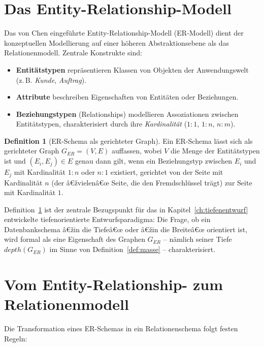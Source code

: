 ﻿\documentclass[a4paper,12pt]{report}
\theoremstyle{definition}
\newtheorem{definition}{Definition}[chapter]
\theoremstyle{remark}
\newcommand{\depth}{\mathit{depth}}
\begin{document}
\section{Das Entity-Relationship-Modell}
\label{sec:ermodell}

Das von Chen eingeführte Entity-Relationship-Modell (ER-Modell) dient
der konzeptuellen Modellierung auf einer höheren Abstraktionsebene als
das Relationenmodell. Zentrale Konstrukte sind:

\begin{itemize}
  \item \textbf{Entitätstypen} repräsentieren Klassen von Objekten der
    Anwendungswelt (z.\,B. \textit{Kunde}, \textit{Auftrag}).
  \item \textbf{Attribute} beschreiben Eigenschaften von Entitäten oder
    Beziehungen.
  \item \textbf{Beziehungstypen} (Relationships) modellieren
    Assoziationen zwischen Entitätstypen, charakterisiert durch ihre
    \emph{Kardinalität} ($1{:}1$, $1{:}n$, $n{:}m$).
\end{itemize}

\begin{definition}[ER-Schema als gerichteter Graph]
\label{def:er-graph}
Ein ER-Schema lässt sich als gerichteter Graph $G_{ER} = (V,E)$ auffassen,
wobei $V$ die Menge der Entitätstypen ist und
$(E_i, E_j) \in E$ genau dann gilt, wenn ein Beziehungstyp zwischen $E_i$
und $E_j$ mit Kardinalität $1{:}n$ oder $n{:}1$ existiert, gerichtet von
der Seite mit Kardinalität $n$ (der â€žvielenâ€œ Seite, die den
Fremdschlüssel trägt) zur Seite mit Kardinalität $1$.
\end{definition}

Definition~\ref{def:er-graph} ist der zentrale Bezugspunkt für das in
Kapitel~\ref{ch:tiefenentwurf} entwickelte tiefenorientierte
Entwurfsparadigma: Die Frage, ob ein Datenbankschema â€žin die Tiefeâ€œ oder
â€žin die Breiteâ€œ orientiert ist, wird formal als eine Eigenschaft des
Graphen $G_{ER}$ -- nämlich seiner Tiefe $\depth(G_{ER})$ im Sinne von
Definition~\ref{def:masse} -- charakterisiert.

\section{Vom Entity-Relationship- zum Relationenmodell}
\label{sec:er-zu-rel}

Die Transformation eines ER-Schemas in ein Relationenschema folgt
festen Regeln:
\end{document}
